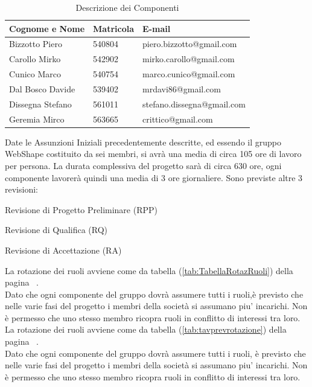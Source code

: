 \begin{table}[h]
	\begin{center}
		  \begin{tabular}{|p{}|l|l|}
		 \hline 
		 \textbf{Cognome e Nome} & \textbf{Matricola} & \textbf{E-mail}\\
		 \hline
		Bizzotto Piero & 540804 & piero.bizzotto@gmail.com \\
		Carollo Mirko & 542902 & mirko.carollo@gmail.com\\
		Cunico Marco & 540754 & marco.cunico@gmail.com\\
		Dal Bosco Davide & 539402 & mrdavi86@gmail.com\\
		Dissegna Stefano & 561011 & stefano.dissegna@gmail.com \\
		Geremia Mirco & 563665 & crittico@gmail.com\\
		\hline
		\end{tabular}
	\caption{Descrizione dei Componenti} 
	\label{tab:tabella_componenti}
	\end{center}	
\end{table}



Date le Assunzioni Iniziali precedentemente descritte, ed essendo il gruppo WebShape costituito da sei membri, si avr\`a una media di circa 105 ore di lavoro per persona. La durata complessiva del progetto sar\`a di circa 630 ore, ogni componente lavorer\`a quindi una media di 3 ore giornaliere. Sono previste altre 3 revisioni:
\begin{elenconumerato}{\normindent}
				\item Revisione di Progetto Preliminare (RPP)
				\item Revisione di Qualifica (RQ)
				\item Revisione di Accettazione (RA)
			\end{elenconumerato}

La rotazione dei ruoli avviene come da tabella (\ref{tab:TabellaRotazRuoli}) della pagina ~\pageref{tab:TabellaRotazRuoli}.\\
Dato che ogni componente del gruppo dovr\`a assumere tutti i ruoli,\`e previsto che nelle varie fasi del progetto i membri della societ\`a si assumano piu' incarichi. Non \`e permesso che uno stesso membro ricopra ruoli in conflitto di interessi tra loro.\\
La rotazione dei ruoli avviene come da tabella (\ref{tab:tavprevrotazione}) della pagina ~\pageref{tab:tabprevrotazione}.\\
Dato che ogni componente del gruppo dovr\`a assumere tutti i ruoli, \`e previsto che nelle varie fasi del progetto i membri della societ\`a si assumano piu' incarichi. Non \`e permesso che uno stesso membro ricopra ruoli in conflitto di interessi tra loro.\\

